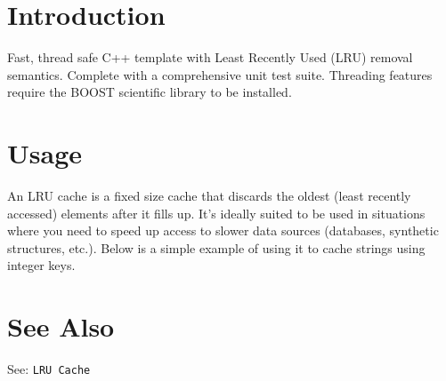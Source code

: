 \section{Introduction}\label{main_intro_section}
Fast, thread safe C++ template with Least Recently Used (LRU) removal semantics. Complete with a comprehensive unit test suite. Threading features require the BOOST scientific library to be installed.\section{Usage}\label{main_usage_section}
An LRU cache is a fixed size cache that discards the oldest (least recently accessed) elements after it fills up. It's ideally suited to be used in situations where you need to speed up access to slower data sources (databases, synthetic structures, etc.). Below is a simple example of using it to cache strings using integer keys.\section{See Also}\label{main_also_section}
See: {\tt LRU Cache} 